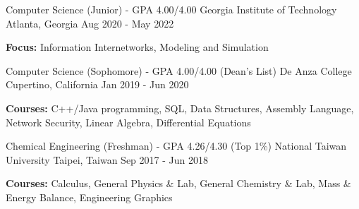 

\begin{cventries}

  \cventry
    {Computer Science (Junior) - GPA 4.00/4.00 } %
    {Georgia Institute of Technology} %
    {Atlanta, Georgia} %
    {Aug 2020 - May 2022} %
   {
		\vspace{-5.0mm}
		\item {\textbf{Focus:} Information Internetworks, Modeling and Simulation} 
   }

  \cventry
    {Computer Science (Sophomore) - GPA 4.00/4.00 (Dean's List)} %
    {De Anza College} %
    {Cupertino, California} %
    {Jan 2019 - Jun 2020} %
   {
		\vspace{-5.0mm}
		\item {\textbf{Courses:} C++/Java programming, SQL, Data Structures, Assembly Language, Network Security, Linear Algebra, Differential Equations}
   }

  \cventry
    {Chemical Engineering (Freshman) - GPA 4.26/4.30 (Top 1\%)} %
    {National Taiwan University} %
    {Taipei, Taiwan} %
    {Sep 2017 - Jun 2018} %
    {
		\vspace{-5.0mm}
		\item {\textbf{Courses:} Calculus, General Physics \& Lab, General Chemistry \& Lab, Mass \& Energy Balance, Engineering Graphics}
	}

\end{cventries}
